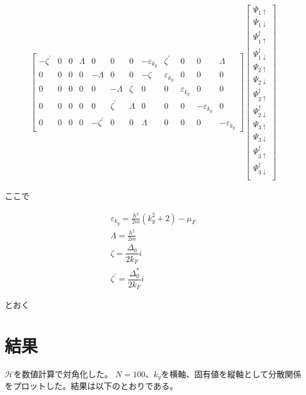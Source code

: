 \documentclass{jsarticle}
\begin{document}
\begin{align}
\begin{bmatrix}
				-\zeta^{'} & 0 & 0 & \varLambda & 0 & 0 & 0 & -\varepsilon_{k_y} & \zeta^{'} & 0 & 0 & \varLambda \\
				0 & 0 & 0 & 0 & -\varLambda & 0 & 0 & -\zeta & \varepsilon_{k_y} & 0 & 0 & 0 \\
				0 & 0 & 0 & 0 & 0 & -\varLambda & \zeta & 0 & 0 & \varepsilon_{k_y} & 0 & 0 \\
				0 & 0 & 0 & 0 & 0 & \zeta^{'} & \varLambda & 0 & 0 & 0 & -\varepsilon_{k_y} & 0 \\
				0 & 0 & 0 & 0 & -\zeta^{'} & 0 & 0 & \varLambda & 0 & 0 & 0 & -\varepsilon_{k_y}
			\end{bmatrix}
			\begin{bmatrix}
				\Psi_{1\uparrow} \\
				\Psi_{1\downarrow} \\
				\Psi_{1\uparrow}^\dagger \\
				\Psi_{1\downarrow}^\dagger \\
				\Psi_{2\uparrow} \\
				\Psi_{2\downarrow} \\
				\Psi_{2\uparrow}^\dagger \\
				\Psi_{2\downarrow}^\dagger \\
				\Psi_{3\uparrow} \\
				\Psi_{3\downarrow} \\
				\Psi_{3\uparrow}^\dagger \\
				\Psi_{3\downarrow}^\dagger \\
			\end{bmatrix}
		\end{align}

		ここで

		\begin{align}
			\varepsilon_{k_y}=\frac{\hbar^2}{2m}(k_y^2+2)-\mu_F \\
			\varLambda=\frac{\hbar^2}{2m}\\
			\zeta=\dfrac{\Delta_0}{2k_{F}}i\\
			\zeta^{'}=\dfrac{\Delta_0^{*}}{2k_{F}}i
		\end{align}


		とおく

		\section{結果}
		$\mathcal{H}$を数値計算で対角化した。
		$N=100$、$k_y$を横軸、固有値を縦軸として分散関係をプロットした。結果は以下のとおりである。
\end{document}
